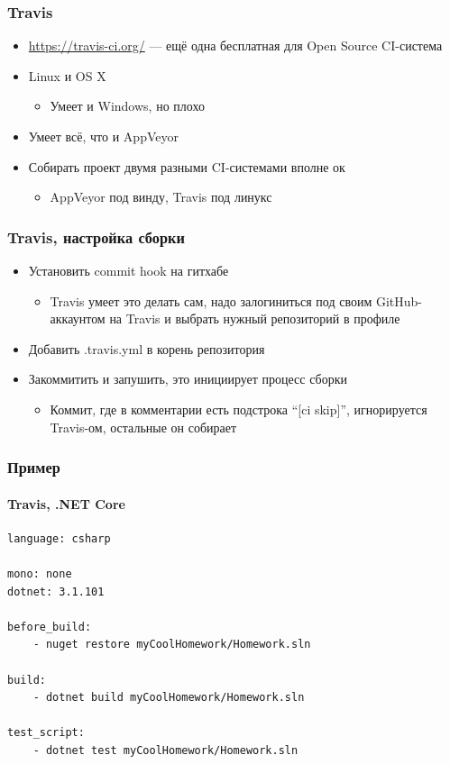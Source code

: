 \documentclass[xetex,mathserif,serif]{beamer}
\begin{document}
    \begin{frame}
        \frametitle{Travis}
        \begin{itemize}
            \item \url{https://travis-ci.org/} --- ещё одна бесплатная для Open Source CI-система
            \item Linux и OS X
            \begin{itemize}
                \item Умеет и Windows, но плохо
            \end{itemize}
            \item Умеет всё, что и AppVeyor
            \item Собирать проект двумя разными CI-системами вполне ок
            \begin{itemize}
                \item AppVeyor под винду, Travis под линукс
            \end{itemize}
        \end{itemize}
    \end{frame}

    \begin{frame}
        \frametitle{Travis, настройка сборки}
        \begin{itemize}
            \item Установить commit hook на гитхабе
            \begin{itemize}
                \item Travis умеет это делать сам, надо залогиниться под своим GitHub-аккаунтом на Travis и выбрать нужный репозиторий в профиле
            \end{itemize}
            \item Добавить .travis.yml в корень репозитория
            \item Закоммитить и запушить, это инициирует процесс сборки
            \begin{itemize}
                \item Коммит, где в комментарии есть подстрока ``[ci skip]'', игнорируется Travis-ом, остальные он собирает
            \end{itemize}
        \end{itemize}
    \end{frame}

    \begin{frame}[fragile]
        \frametitle{Пример}
        \framesubtitle{Travis, .NET Core}
        \begin{verbatim}
language: csharp

mono: none
dotnet: 3.1.101

before_build: 
    - nuget restore myCoolHomework/Homework.sln

build: 
    - dotnet build myCoolHomework/Homework.sln

test_script: 
    - dotnet test myCoolHomework/Homework.sln
        \end{verbatim}
    \end{frame}
\end{document}

